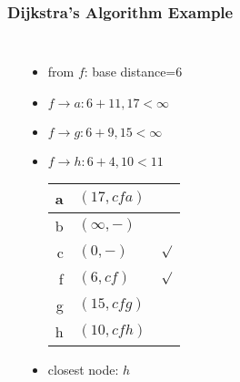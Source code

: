 \documentclass[dvipsnames]{beamer}
\begin{document}
\begin{frame}
  \frametitle{Dijkstra's Algorithm Example}

  \begin{columns}
    \begin{center}
    \end{center}

    \begin{itemize}
      \item from $f$: base distance=$6$
      \item $f \rightarrow a: 6+11, 17 < \infty$
      \item $f \rightarrow g: 6+9, 15 < \infty$
      \item $f \rightarrow h: 6+4, 10 < 11$

      \pause
      \begin{table}
        \begin{tabular}{r|l|c}
          a & $(17,cfa)$   & \\\hline
          b & $(\infty,-)$ & \\\hline
          c & $(0,-)$      & $\surd$ \\\hline
          f & $(6,cf)$     & $\surd$ \\\hline
          g & $(15,cfg)$   & \\\hline
          h & $(10,cfh)$   &
        \end{tabular}
      \end{table}

      \pause
      \item closest node: $h$
    \end{itemize}
  \end{columns}
\end{frame}
\end{document}
